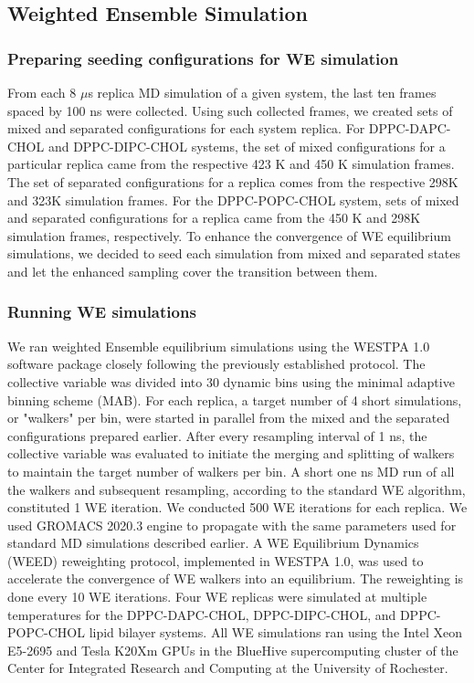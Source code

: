 \documentclass{biophys-new}
\begin{document}
\subsection*{Weighted Ensemble Simulation}

\subsubsection*{Preparing seeding configurations for WE simulation} 
From each 8 $\mu$s replica MD simulation of a given system, the last ten frames spaced by 100 ns were collected.
Using such collected frames, we created sets of mixed and separated configurations for each system replica.
For DPPC-DAPC-CHOL and DPPC-DIPC-CHOL systems, the set of mixed configurations for a particular replica came from the respective 423 K and 450 K simulation frames. 
The set of separated configurations for a replica comes from the respective 298K and 323K simulation frames.
For the DPPC-POPC-CHOL system, sets of mixed and separated configurations for a replica came from the 450 K and 298K simulation frames, respectively.
To enhance the convergence of WE equilibrium simulations, we decided to seed each simulation from mixed and separated states and let the enhanced sampling cover the transition between them.

\subsubsection*{Running WE simulations} 
We ran weighted Ensemble equilibrium simulations using the WESTPA 1.0 software package\cite{Zwier2015} closely following the previously established protocol\cite{Bogetti2019}.
The collective variable was divided into 30 dynamic bins using the minimal adaptive binning scheme (MAB)\cite{Torrillo2021}.
For each replica, a target number of 4 short simulations, or "walkers" per bin, were started in parallel from the mixed and the separated configurations prepared earlier.
After every resampling interval of 1 ns, the collective variable was evaluated to initiate the merging and splitting of walkers to maintain the target number of walkers per bin.
A short one ns MD run of all the walkers and subsequent resampling, according to the standard WE algorithm, constituted 1 WE iteration. 
We conducted 500 WE iterations for each replica.
We used GROMACS 2020.3 engine to propagate with the same parameters used for standard MD simulations described earlier.
A WE Equilibrium Dynamics (WEED) reweighting protocol\cite{Bhatt2010, Suarez2014}, implemented in WESTPA 1.0, was used to accelerate the convergence of WE walkers into an equilibrium.
The reweighting is done every 10 WE iterations.
Four WE replicas were simulated at multiple temperatures for the DPPC-DAPC-CHOL, DPPC-DIPC-CHOL, and DPPC-POPC-CHOL lipid bilayer systems. 
All WE simulations ran using the Intel Xeon E5-2695 and Tesla K20Xm GPUs in the BlueHive supercomputing cluster of the Center for Integrated Research and Computing at the University of Rochester.   
\end{document}
